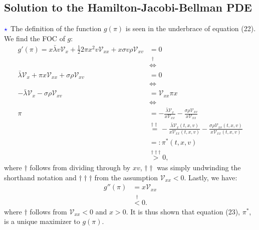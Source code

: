 \documentclass[11pt]{article}
\numberwithin{equation}{section}
\begin{document}
\newpage
\subsection{Solution to the Hamilton-Jacobi-Bellman PDE}
$\textcolor{blue}{\star}$ The definition of the function $g(\pi)$ is seen in the
underbrace of equation (22). We find the FOC of $g$:
\begin{align*}
    g'(\pi) = x\bar{\lambda} v \mathcal{V}_x + \frac{1}{2} 2\pi x^2 v \mathcal{V}_{xx} + x\sigma v\rho \mathcal{V}_{xv} &= 0 \\
    &\overset{\dagger}{\iff}\\
     \bar{\lambda} \mathcal{V}_x + \pi x \mathcal{V}_{xx} + \sigma\rho \mathcal{V}_{xv} &= 0 \\
    &\iff\\
      -\bar{\lambda} \mathcal{V}_x - \sigma\rho \mathcal{V}_{xv}&=\mathcal{V}_{xx}\pi x  \\
     &\iff\\
     \pi&=-\frac{\bar{\lambda} \mathcal{V}_x}{x \mathcal{V}_{xx}} - \frac{\sigma\rho \mathcal{V}_{xv}}{x \mathcal{V}_{xx}} \\
     &\overset{\dagger\dagger}{=}-\frac{\bar{\lambda} \mathcal{V}_x(t, x, v)}{x \mathcal{V}_{xx}(t, x, v)} - \frac{\sigma\rho \mathcal{V}_{xv}(t, x, v)}{x \mathcal{V}_{xx}(t, x, v)} 
    \\&=: \pi^*(t, x, v) \\&\overset{\dagger\dagger\dagger}{>} 0,
\end{align*}
where $\dagger$ follows from dividing through by $xv$, $\dagger\dagger$ was simply undwinding the shorthand notation and
$\dagger\dagger\dagger$ from the assumption  $\mathcal{V}_{xx}<0$. Lastly, we have:
\begin{align*}
    g''(\pi)&=x\mathcal{V}_{xx}\\
    &\overset{\dagger}{<}0.
\end{align*}
where $\dagger$ follows from $\mathcal{V}_{xx}<0$ and $x>0$. It is thus shown that equation (23), $\pi^*$, is a unique
maximizer to $g(\pi)$.
\end{document}
